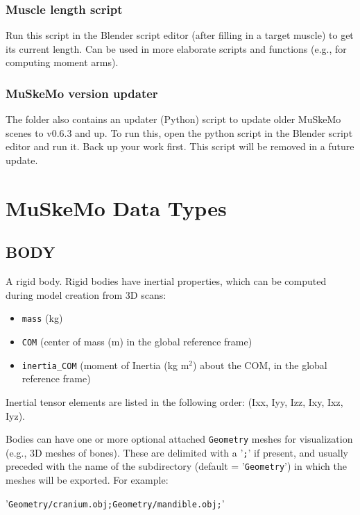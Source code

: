\documentclass{article}
\begin{document}
\subsubsection{Muscle length script}

Run this script in the Blender script editor (after filling in a target muscle) to get its current length. Can be used in more elaborate scripts and functions (e.g., for computing moment arms).


\subsubsection{MuSkeMo version updater}
The folder also contains an updater (Python) script to update older MuSkeMo scenes to v0.6.3 and up. To run this, open the python script in the Blender script editor and run it. Back up your work first. This script will be removed in a future update.


\section{MuSkeMo Data Types}
\label{sec:DataTypes}

\subsection{BODY}
\label{sec:body}

A rigid body. Rigid bodies have inertial properties, which can be computed during model creation from 3D scans:

\begin{itemize}
    \item \texttt{mass} (kg)
    \item \texttt{COM} (center of mass (m) in the global reference frame)
    \item \texttt{inertia\_COM} (moment of Inertia (kg m\(^2\)) about the COM, in the global reference frame)
\end{itemize}

Inertial tensor elements are listed in the following order: (Ixx, Iyy, Izz, Ixy, Ixz, Iyz).

Bodies can have one or more optional attached \texttt{Geometry} meshes for visualization (e.g., 3D meshes of bones). These are delimited with a '\texttt{;}' if present, and usually preceded with the name of the subdirectory (default = '\texttt{Geometry}') in which the meshes will be exported. For example: 

'\texttt{Geometry/cranium.obj;Geometry/mandible.obj;}'
\end{document}
